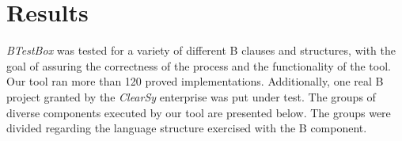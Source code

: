 \documentclass[runningheads]{llncs}
\begin{document}
\section{Results} \label{sec:Results}


\textit{BTestBox} was tested for a variety of different B clauses and structures, with the goal of assuring the correctness of the process and the functionality of the tool. Our tool ran more than 120 proved implementations. Additionally, one real B project granted by the \textit{ClearSy} enterprise was put under test. The groups of diverse components executed by our tool are presented below. The groups were divided regarding the language structure exercised with the B component.

\end{document}
